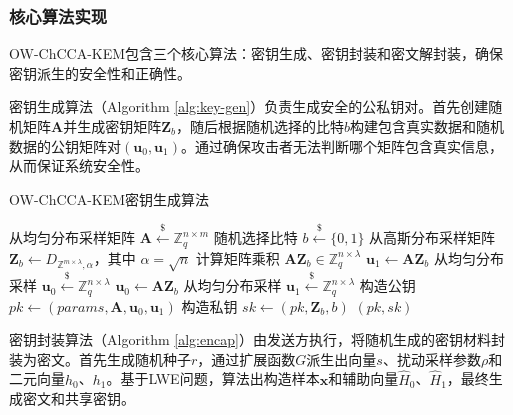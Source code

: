 \subsubsection{核心算法实现}

OW-ChCCA-KEM包含三个核心算法：密钥生成、密钥封装和密文解封装，确保密钥派生的安全性和正确性。

密钥生成算法（Algorithm \ref{alg:key-gen}）负责生成安全的公私钥对。首先创建随机矩阵$\mathbf{A}$并生成密钥矩阵$\mathbf{Z}_b$，随后根据随机选择的比特$b$构建包含真实数据和随机数据的公钥矩阵对$(\mathbf{u}_0, \mathbf{u}_1)$。通过确保攻击者无法判断哪个矩阵包含真实信息，从而保证系统安全性。

\begin{algorithm}
\caption{OW-ChCCA-KEM密钥生成算法}
\label{alg:key-gen}
\begin{algorithmic}[1]
    \State 从均匀分布采样矩阵 $\mathbf{A} \stackrel{\$}{\leftarrow} \mathbb{Z}_q^{n \times m}$
    \State 随机选择比特 $b \stackrel{\$}{\leftarrow} \{0, 1\}$
    \State 从高斯分布采样矩阵 $\mathbf{Z}_b \leftarrow D_{\mathbb{Z}^{m \times \lambda}, \alpha}$，其中 $\alpha = \sqrt{n}$
    \State 计算矩阵乘积 $\mathbf{A}\mathbf{Z}_b \in \mathbb{Z}_q^{n \times \lambda}$
        \State $\mathbf{u}_1 \gets \mathbf{A}\mathbf{Z}_b$
        \State 从均匀分布采样 $\mathbf{u}_0 \stackrel{\$}{\leftarrow} \mathbb{Z}_q^{n \times \lambda}$
    \Else
        \State $\mathbf{u}_0 \gets \mathbf{A}\mathbf{Z}_b$
        \State 从均匀分布采样 $\mathbf{u}_1 \stackrel{\$}{\leftarrow} \mathbb{Z}_q^{n \times \lambda}$
    \EndIf
    \State 构造公钥 $pk \gets (params, \mathbf{A}, \mathbf{u}_0, \mathbf{u}_1)$
    \State 构造私钥 $sk \gets (pk, \mathbf{Z}_b, b)$
    \State \Return $(pk, sk)$
\EndProcedure
\end{algorithmic}
\end{algorithm}

密钥封装算法（Algorithm \ref{alg:encap}）由发送方执行，将随机生成的密钥材料封装为密文。首先生成随机种子$r$，通过扩展函数$G$派生出向量$s$、扰动采样参数$\rho$和二元向量$h_0$、$h_1$。基于LWE问题，算法出构造样本$\mathbf{x}$和辅助向量$\hat{H}_0$、$\hat{H}_1$，最终生成密文和共享密钥。

